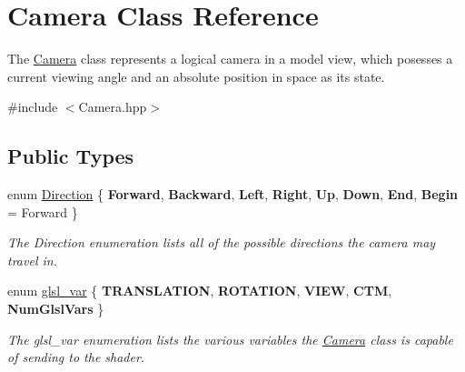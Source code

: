 \hypertarget{class_camera}{\section{\-Camera \-Class \-Reference}
\label{class_camera}
}


\-The \hyperlink{class_camera}{\-Camera} class represents a logical camera in a model view, which posesses a current viewing angle and an absolute position in space as its state.  




{\ttfamily \#include $<$\-Camera.\-hpp$>$}

\subsection*{\-Public \-Types}
\begin{DoxyCompactItemize}
\item 
enum \hyperlink{class_camera_a80cb65605322d27ad3b6d973484509ec}{\-Direction} \{ \*
{\bfseries \-Forward}, 
{\bfseries \-Backward}, 
{\bfseries \-Left}, 
{\bfseries \-Right}, 
\*
{\bfseries \-Up}, 
{\bfseries \-Down}, 
{\bfseries \-End}, 
{\bfseries \-Begin} =  \-Forward
 \}
\begin{DoxyCompactList}\small\item\em \-The \-Direction enumeration lists all of the possible directions the camera may travel in. \end{DoxyCompactList}\item 
enum \hyperlink{class_camera_a6ff726a75a430e4f17e5dec42e4d4405}{glsl\-\_\-var} \{ \*
{\bfseries \-T\-R\-A\-N\-S\-L\-A\-T\-I\-O\-N}, 
{\bfseries \-R\-O\-T\-A\-T\-I\-O\-N}, 
{\bfseries \-V\-I\-E\-W}, 
{\bfseries \-C\-T\-M}, 
\*
{\bfseries \-Num\-Glsl\-Vars}
 \}
\begin{DoxyCompactList}\small\item\em \-The glsl\-\_\-var enumeration lists the various variables the \hyperlink{class_camera}{\-Camera} class is capable of sending to the shader. \end{DoxyCompactList}\end{DoxyCompactItemize}
